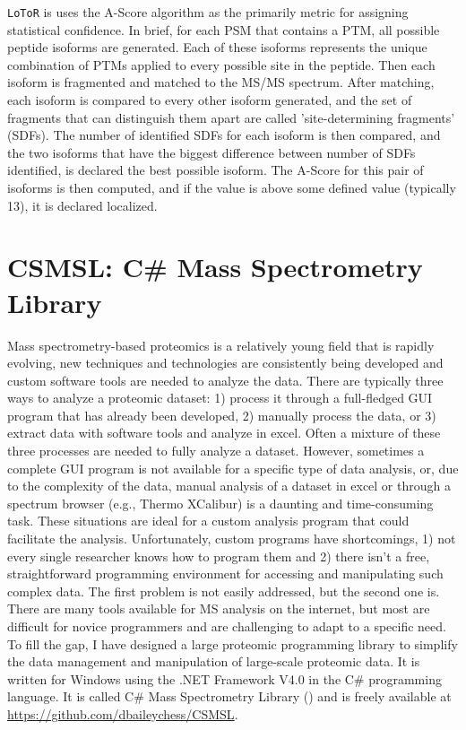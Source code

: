 \texttt{LoToR} is uses the A-Score algorithm as the primarily metric for assigning statistical confidence.\cite{ascore} In brief, for each PSM that contains a PTM, all possible peptide isoforms are generated. Each of these isoforms represents the unique combination of PTMs applied to every possible site in the peptide. Then each isoform is fragmented and matched to the MS/MS spectrum. After matching, each isoform is compared to every other isoform generated, and the set of fragments that can distinguish them apart are called 'site-determining fragments' (SDFs). The number of identified SDFs for each isoform is then compared, and the two isoforms that have the biggest difference between number of SDFs identified, is declared the best possible isoform. The A-Score for this pair of isoforms is then computed, and if the value is above some defined value (typically 13), it is declared localized.

\section{CSMSL: C\# Mass Spectrometry Library}
Mass spectrometry-based proteomics is a relatively young field that is rapidly evolving, new techniques and technologies are consistently being developed and custom software tools are needed to analyze the data. There are typically three ways to analyze a proteomic dataset: 1) process it through a full-fledged GUI program that has already been developed, 2) manually process the data, or 3) extract data with software tools and analyze in excel. Often a mixture of these three processes are needed to fully analyze a dataset. However, sometimes a complete GUI program is not available for a specific type of data analysis, or, due to the complexity of the data, manual analysis of a dataset in excel or through a spectrum browser (e.g., Thermo XCalibur) is a daunting and time-consuming task. These situations are ideal for a custom analysis program that could facilitate the analysis. Unfortunately, custom programs have shortcomings, 1) not every single researcher knows how to program them and 2) there isn't a free, straightforward programming environment for accessing and manipulating such complex data. The first problem is not easily addressed, but the second one is. There are many tools available for MS analysis on the internet, but most are difficult for novice programmers and are challenging to adapt to a specific need. To fill the gap, I have designed a large proteomic programming library to simplify the data management and manipulation of large-scale proteomic data. It is written for Windows using the .NET Framework V4.0 in the C\# programming language. It is called C\# Mass Spectrometry Library (\csmsl{}) and is freely available at \url{https://github.com/dbaileychess/CSMSL}.

